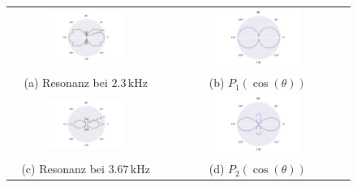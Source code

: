\begin{figure}[H]
  \centering
  \begin{tabular}{cc}
    \includegraphics[width=0.5\textwidth]{Daten/Wasserstoff/peak0.pdf} &   \includegraphics[width=0.5\textwidth]{Daten/Wasserstoff/peakLeg0.pdf} \\
  (a) Resonanz bei $2.3 \,\si{\kilo\hertz} $& (b) $P_1(\cos(\theta))$ \\[6pt]
  \includegraphics[width=0.5\textwidth]{Daten/Wasserstoff/peak1.pdf} &   \includegraphics[width=0.5\textwidth]{Daten/Wasserstoff/peakLeg1.pdf} \\
  (c) Resonanz bei $3.67 \,\si{\kilo\hertz}$ & (d) $P_2(\cos(\theta))$ \\[6pt]

\end{tabular}
\end{figure}
